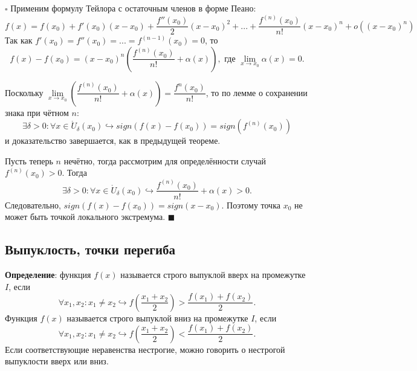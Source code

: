 \documentclass[12pt, a4paper, reqno]{article}
\begin{document}
    $\square$ Применим формулу Тейлора с остаточным членов в форме Пеано:
    \begin{equation*}
        f(x) = f(x_0) + f'(x_0)(x - x_0) + \dfrac{f''(x_0)}{2}(x - x_0)^2 + ... +
        \dfrac{f^{(n)}(x_0)}{n!}(x - x_0)^n + o\left((x - x_0)^n\right)
    \end{equation*}
    Так как $f'(x_0) = f''(x_0) = ... = f^{(n - 1)}(x_0) = 0$, то
    \begin{equation*}
        f(x) - f(x_0) = (x - x_0)^n\left(\dfrac{f^{(n)}(x_0)}{n!} + \alpha(x)\right),
        \text{ где }\lim\limits_{x\to x_0} \alpha(x) = 0.
    \end{equation*}

    Поскольку $\lim\limits_{x\to x_0} \left(\dfrac{f^{(n)}(x_0)}{n!} + \alpha(x)\right) =
    \dfrac{f^{n}(x_0)}{n!}$, то по лемме о сохранении знака при чётном $n$:
    \begin{equation*}
        \exists\delta > 0: \forall x\in\mathring U_{\delta}(x_0)\hookrightarrow sign(f(x) - f(x_0))
        = sign(f^{(n)}(x_0))
    \end{equation*}
    и доказательство завершается, как в предыдущей теореме.

    Пусть теперь $n$ нечётно, тогда рассмотрим для определённости случай $f^{(n)}(x_0) > 0$. Тогда
    \begin{equation*}
        \exists\delta > 0: \forall x\in\mathring U_{\delta}(x_0)\hookrightarrow
        \dfrac{f^{(n)}(x_0)}{n!} + \alpha(x) > 0.
    \end{equation*}
    Следовательно, $sign(f(x) - f(x_0)) = sign(x - x_0)$. Поэтому точка $x_0$ не может быть точкой
    локального экстремума. $\blacksquare$

\subsection{Выпуклость, точки перегиба}

    \textbf{Определение}: функция $f(x)$ называется строго выпуклой вверх на промежутке $I$, если
    \begin{equation*}
        \forall x_1, x_2: x_1\neq x_2\hookrightarrow f\left(\dfrac{x_1 + x_2}{2}\right) >
        \dfrac{f(x_1) + f(x_2)}{2}.
    \end{equation*}
    Функция $f(x)$ называется строго выпуклой вниз на промежутке $I$, если
    \begin{equation*}
        \forall x_1, x_2: x_1\neq x_2\hookrightarrow f\left(\dfrac{x_1 + x_2}{2}\right) <
        \dfrac{f(x_1) + f(x_2)}{2}.
    \end{equation*}
    Если соответствующие неравенства нестрогие, можно говорить о нестрогой выпуклости вверх или вниз.
\end{document}
